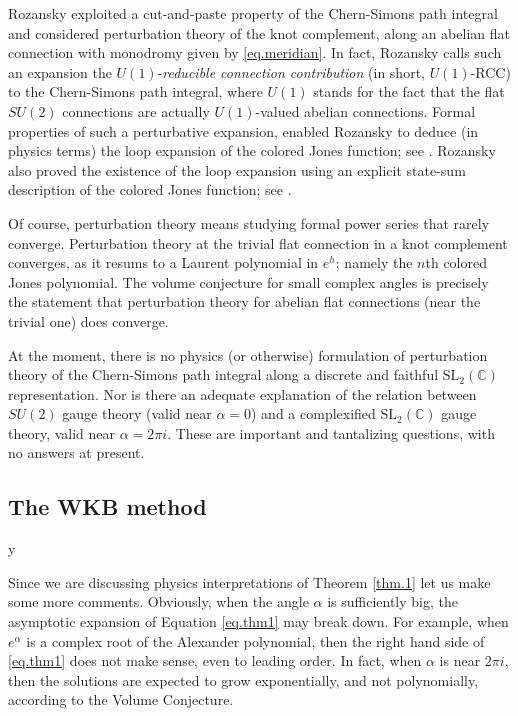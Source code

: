 \documentclass{amsart}
\theoremstyle{definition}
\def\printname#1{
    \if\draft y
        \smash{\makebox[0pt]{\hspace{-0.5in}
            \raisebox{8pt}{\tt\tiny #1}}}
    \fi
}
\def\lbl#1{\label{#1}\printname{#1}}
\def\BC{\mathbb C}
\def\a{\alpha}
\def\SL{\mathrm{SL}}
\begin{document}
Rozansky exploited a cut-and-paste property of the Chern-Simons path integral
and considered perturbation theory of the knot complement, along an abelian
flat connection with monodromy given by \eqref{eq.meridian}. In fact, Rozansky
calls such an expansion the $U(1)$-{\em reducible connection contribution}
(in short, $U(1)$-RCC) to the
Chern-Simons path integral, where $U(1)$ stands for the fact that the flat
$SU(2)$ connections are actually $U(1)$-valued abelian connections.
Formal properties of such a perturbative expansion, enabled Rozansky to
deduce (in physics terms) the loop expansion of the colored Jones function;
see \cite{Ro2}.
Rozansky also proved the existence of the loop expansion
using an explicit state-sum description of the colored Jones function;
see \cite{Ro1}.

Of course, perturbation theory means studying formal power series that rarely
converge. Perturbation theory at the trivial flat connection in a knot
complement converges, as it resums to a Laurent polynomial in $e^h$; namely
the $n$th colored Jones polynomial.
The volume conjecture for small complex angles is precisely the
statement that perturbation theory for abelian flat connections (near the
trivial one) does converge.

At the moment, there is no physics (or otherwise) formulation of perturbation
theory of the Chern-Simons path integral along a discrete and faithful
$\SL_2(\BC)$ representation. Nor is there an adequate explanation of the
relation between $SU(2)$ gauge theory (valid near $\a=0$) and
a complexified $\SL_2(\BC)$ gauge theory, valid near $\a=2\pi i$.
These are important and tantalizing questions, with no answers at present.




\subsection{The WKB method}
\lbl{sec.WKB}

Since we are discussing physics interpretations of Theorem \ref{thm.1}
let us make some more comments. Obviously, when the angle
$\a$ is sufficiently big, the asymptotic expansion of Equation \eqref{eq.thm1}
may break down. For example, when $e^{\a}$ is a complex root of the Alexander
polynomial, then the right hand side of \eqref{eq.thm1} does not make sense,
even to leading order. In fact, when $\a$ is near $2 \pi i$, then the solutions
are expected to grow exponentially, and not polynomially, according to the
Volume Conjecture.
\end{document}
